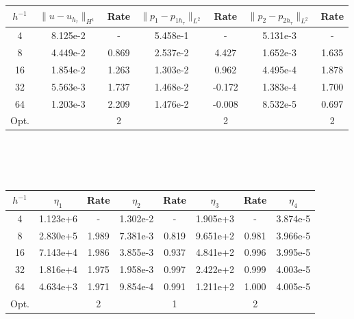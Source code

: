 \\
\\
\begin{center} 
\centering
\begin{tabular}{c|c|c|c|c|c|c}
$h^{-1}$ & $\|u - u_{h_{\tau}}\|_{H^1}$ & Rate & $\|p_1 - p_{1h_{\tau}}\|_{L^2}$ & Rate & $\|p_2 - p_{2h_{\tau}}\|_{L^2}$ & Rate\\\hline
4  & 8.125e-2 & -     & 5.458e-1 & -     & 5.131e-3 & -     \\
8  & 4.449e-2 & 0.869 & 2.537e-2 & 4.427 & 1.652e-3 & 1.635 \\
16 & 1.854e-2 & 1.263 & 1.303e-2 & 0.962 & 4.495e-4 & 1.878 \\
32 & 5.563e-3 & 1.737 & 1.468e-2 & -0.172 & 1.383e-4 & 1.700 \\
64 & 1.203e-3 & 2.209 & 1.476e-2 & -0.008 & 8.532e-5 & 0.697 \\\hline
Opt. & & 2 & & 2 & & 2
\end{tabular}
 \label{tab:bb_bio_space_error}
\end{center}
\mbox{}\\ \\ \\
\begin{center} 
\centering
\begin{tabular}{c|c|c|c|c|c|c|c}
$h^{-1}$ & $\eta_1$ & Rate &  $\eta_2$ & Rate & $\eta_3$ & Rate & $\eta_4$ \\\hline
4  & 1.123e+6 & -     & 1.302e-2 & -     & 1.905e+3 & -     & 3.874e-5 \\
8  & 2.830e+5 & 1.989 & 7.381e-3 & 0.819 & 9.651e+2 & 0.981 & 3.966e-5 \\
16 & 7.143e+4 & 1.986 & 3.855e-3 & 0.937 & 4.841e+2 & 0.996 & 3.995e-5 \\
32 & 1.816e+4 & 1.975 & 1.958e-3 & 0.997 & 2.422e+2 & 0.999 & 4.003e-5 \\
64 & 4.634e+3 & 1.971 & 9.854e-4 & 0.991 & 1.211e+2 & 1.000 & 4.005e-5 \\\hline
Opt. & & 2 & & 1  & & 2 & 
\end{tabular}
 \label{tab:bb_bio_space_est}
\end{center}

